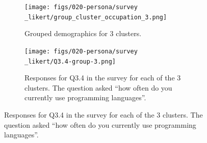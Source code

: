 \documentclass[020-persona\_validation.tex]{subfiles}
\begin{document}
        \begin{figure}[htb!]
            \centering
            \begin{subfigure}[h]{0.45\textwidth}
                \centering
                \texttt{[image: figs/020-persona/survey\\\_likert/group\_cluster\_occupation\_3.png]}
                \caption[Grouped demographics for 3 clusters]
                {Grouped demographics for 3 clusters.
                }
                \label{sfig:cluster-grouped-demogrphics}
            \end{subfigure}
            \begin{subfigure}[h]{0.45\textwidth}
                \centering
                \texttt{[image: figs/020-persona/survey\\\_likert/Q3.4-group-3.png]}
                \caption[How often do you program (Q3.4) for 3 clusters]
                {Responses for Q3.4 in the survey for each of the 3 clusters.
                    The question asked ``how often do you currently use programming languages''.
                }
                \label{sfig:cluster-q3-4}
            \end{subfigure}


\end{figure}
\end{document}
